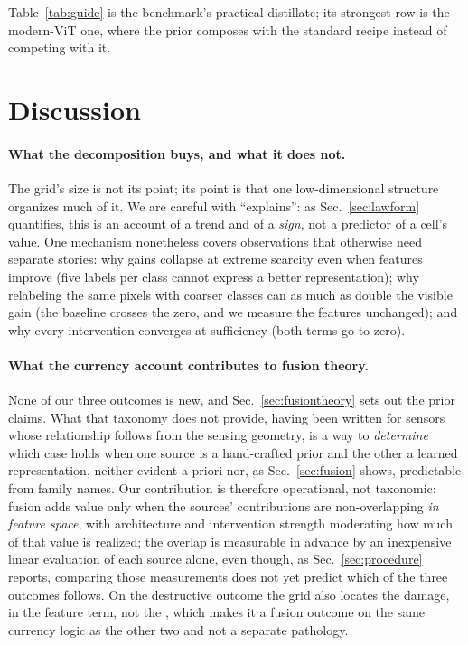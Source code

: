 Table~\ref{tab:guide} is the benchmark's practical distillate; its
strongest row is the modern-ViT one, where the prior composes with the
standard recipe instead of competing with it.

\section{Discussion}\label{sec:discussion}

\paragraph{What the decomposition buys, and what it does not.} 
The grid's size is not its point; its point is that one low-dimensional
structure organizes much of it. We are careful with ``explains'': as
Sec.~\ref{sec:lawform} quantifies, this is an account of a trend and of a
\emph{sign}, not a predictor of a cell's value. One mechanism nonetheless
covers observations that otherwise need separate stories: why gains collapse at
extreme scarcity even when features improve (five labels per class cannot
express a better representation); why relabeling the same pixels with coarser
classes can as much as double the visible gain (the baseline crosses the \readout{} zero, and we
measure the features unchanged); and why every intervention converges at
sufficiency (both terms go to zero).

\paragraph{What the currency account contributes to fusion theory.}
 None of our three outcomes is new, and
Sec.~\ref{sec:fusiontheory} sets out the prior claims. What that taxonomy
does not provide, having been written for sensors whose relationship follows
from the sensing geometry, is a way to \emph{determine} which case holds when
one source is a hand-crafted prior and the other a learned representation,
neither evident a priori nor, as Sec.~\ref{sec:fusion} shows, predictable
from family names. Our contribution is therefore operational, not taxonomic: fusion
adds value only when the sources' contributions are non-overlapping
\emph{in feature space}, with architecture and intervention strength
moderating how much of that value is realized; the overlap is measurable in
advance by an
inexpensive linear evaluation of each source alone, even though, as
Sec.~\ref{sec:procedure} reports, comparing those measurements does not yet
predict which of the three outcomes follows. On the destructive outcome the grid also locates the
damage, in the feature term, not the \readout{}, which makes it a fusion
outcome on the same currency logic as the other two and not a separate
pathology.

